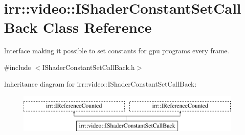 \hypertarget{classirr_1_1video_1_1IShaderConstantSetCallBack}{}\section{irr\+:\+:video\+:\+:I\+Shader\+Constant\+Set\+Call\+Back Class Reference}
\label{classirr_1_1video_1_1IShaderConstantSetCallBack}


Interface making it possible to set constants for gpu programs every frame.  




{\ttfamily \#include $<$I\+Shader\+Constant\+Set\+Call\+Back.\+h$>$}

Inheritance diagram for irr\+:\+:video\+:\+:I\+Shader\+Constant\+Set\+Call\+Back\+:\begin{figure}[H]
\begin{center}
\leavevmode
\includegraphics[height=2.000000cm]{classirr_1_1video_1_1IShaderConstantSetCallBack}
\end{center}
\end{figure}
